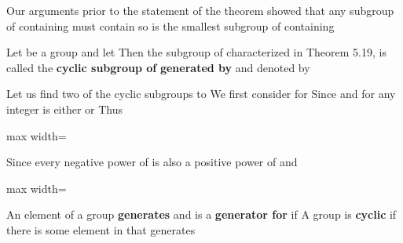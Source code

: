 \documentclass[11pt,oneside]{article}
\begin{document}
\begin{BookBody}

Our arguments prior to the statement of the theorem showed that any subgroup of  containing  must contain  so  is the smallest subgroup of  containing \BookEnd{\blacklozenge}

 Let  be a group and let  Then the subgroup  of  characterized in Theorem 5.19, is called the\textbf{ cyclic subgroup of}  \textbf{generated by}  and denoted by \BookEnd{\blacksquare}

 Let us find two of the cyclic subgroups to  We first consider  for  Since  and  for any integer  is either  or  Thus

\begin{center}\begin{adjustbox}{max width=\linewidth}\end{adjustbox}\end{center}

\noindent Since  every negative power of \BookInline{\rho } is also a positive power of \BookInline{\rho } and 

\begin{center}\begin{adjustbox}{max width=\linewidth}\end{adjustbox}\end{center} \BookEnd{\blacktriangle}

 An element  of a group  \textbf{generates}  and is a\textbf{ generator for}  if  A group  is\textbf{ cyclic} if there is some element  in  that generates \BookEnd{\blacksquare}


\end{BookBody}
\end{document}
